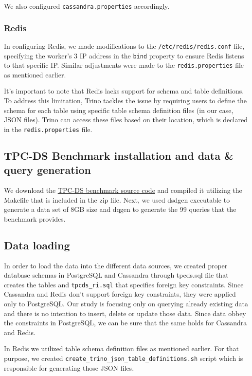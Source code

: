 \documentclass[conference]{IEEEtran}
\begin{document}
We also configured \texttt{cassandra.properties} accordingly.

\subsubsection{Redis}


In configuring Redis, we made modifications to the \texttt{/etc/redis/redis.conf} file, specifying the worker's 3 IP address in the \texttt{bind} property
to ensure Redis listens to that specific IP. Similar adjustments were made to the \texttt{redis.properties} file as mentioned earlier.

It's important to note that Redis lacks support for schema and table definitions. To address this limitation, Trino tackles the issue by requiring users to
define the schema for each table using specific table schema definition files (in our case, JSON files). Trino can access these files based on their location, which is declared in the \texttt{redis.properties} file.

\subsection{TPC-DS Benchmark installation and data \& query generation}

We download the \textcolor{linkblue}{\underline{\href{https://www.tpc.org/tpc_documents_current_versions/current_specifications5.asp}{TPC-DS benchmark source code}}} and compiled it
utilizing the Makefile that is included in the zip file. Next, we used dsdgen executable to generate a data set of 8GB size and dqgen to generate the 99 queries that the benchmark provides.

\subsection{Data loading}

In order to load the data into the different data sources, we created proper database schemas in PostgreSQL and Cassandra through
tpcds.sql file that creates the tables and \texttt{tpcds\_ri.sql} that specifies foreign key constraints. Since Cassandra and Redis don't support foreign key constraints, they were applied only to PostgreSQL. Our
study is focusing only on querying already existing data and there is no intention to insert, delete or update those data. Since data obbey the constraints in PostgreSQL, we can be sure that the same holds
for Cassandra and Redis.

In Redis we utilized table schema definition files as mentioned earlier. For that purpose, we created \texttt{create\_trino\_json\_table\_definitions.sh} script which is responsible for generating those JSON files.
\end{document}
